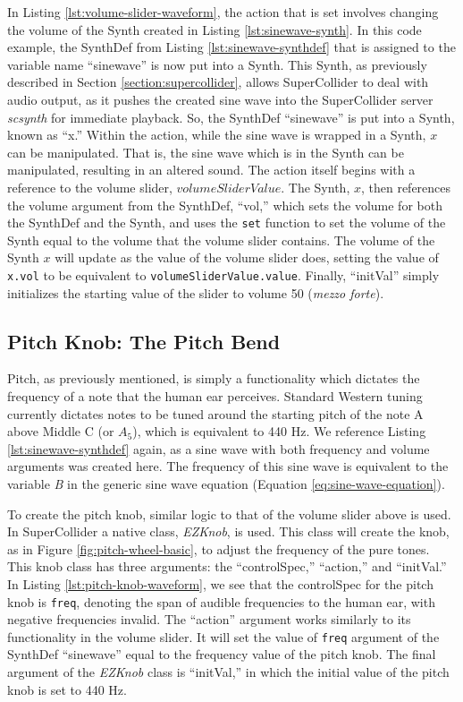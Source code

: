 In Listing \ref{lst:volume-slider-waveform}, the action that is set involves changing the volume of the Synth created in Listing \ref{lst:sinewave-synth}. In this code example, the SynthDef from Listing \ref{lst:sinewave-synthdef} that is assigned to the variable name ``sinewave'' is now put into a Synth. This Synth, as previously described in Section \ref{section:supercollider}, allows SuperCollider to deal with audio output, as it pushes the created sine wave into the SuperCollider server \textit{scsynth} for immediate playback. So, the SynthDef ``sinewave'' is put into a Synth, known as ``x.'' Within the action, while the sine wave is wrapped in a Synth, $x$ can be manipulated. That is, the sine wave which is in the Synth can be manipulated, resulting in an altered sound. The action itself begins with a reference to the volume slider, $volumeSliderValue$. The Synth, $x$, then references the volume argument from the SynthDef, ``vol,'' which sets the volume for both the SynthDef and the Synth, and uses the \texttt{set} function to set the volume of the Synth equal to the volume that the volume slider contains. The volume of the Synth $x$ will update as the value of the volume slider does, setting the value of \texttt{x.vol} to be equivalent to \texttt{volumeSliderValue.value}. Finally, ``initVal'' simply initializes the starting value of the slider to volume 50 (\textit{mezzo forte}).

\subsection{Pitch Knob: The Pitch Bend}

Pitch, as previously mentioned, is simply a functionality which dictates the frequency of a note that the human ear perceives. Standard Western tuning currently dictates notes to be tuned around the starting pitch of the note A above Middle C (or $A_5$), which is equivalent to 440 Hz. We reference Listing \ref{lst:sinewave-synthdef} again, as a sine wave with both frequency and volume arguments was created here. The frequency of this sine wave is equivalent to the variable \textit{B} in the generic sine wave equation (Equation \ref{eq:sine-wave-equation}).

To create the pitch knob, similar logic to that of the volume slider above is used. In SuperCollider a native class, \textit{EZKnob}, is used. This class will create the knob, as in Figure \ref{fig:pitch-wheel-basic}, to adjust the frequency of the pure tones. This knob class has three arguments: the ``controlSpec,'' ``action,'' and ``initVal.'' In Listing \ref{lst:pitch-knob-waveform}, we see that the controlSpec for the pitch knob is \texttt{freq}, denoting the span of audible frequencies to the human ear, with negative frequencies invalid. The ``action'' argument works similarly to its functionality in the volume slider. It will set the value of \texttt{freq} argument of the SynthDef ``sinewave'' equal to the frequency value of the pitch knob. The final argument of the \textit{EZKnob} class is ``initVal,'' in which the initial value of the pitch knob is set to 440 Hz.

